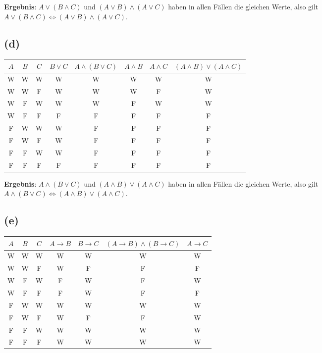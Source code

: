 \documentclass[a4paper]{scrartcl}
\begin{document}
\textbf{Ergebnis}: $A \lor (B \land C)$ und $(A \lor B) \land (A \lor C)$ haben in allen Fällen die gleichen Werte, also gilt $A \lor (B \land C) \Leftrightarrow (A \lor B) \land (A \lor C)$.

\subsection*{(d)}

\begin{tabular}{|c|c|c|c|c|c|c|c|}
\hline
$A$ & $B$ & $C$ & $B \lor C$ & $A \land (B \lor C)$ & $A \land B$ & $A \land C$ & $(A \land B) \lor (A \land C)$ \\
\hline
W & W & W & W & W & W & W & W \\
W & W & F & W & W & W & F & W \\
W & F & W & W & W & F & W & W \\
W & F & F & F & F & F & F & F \\
F & W & W & W & F & F & F & F \\
F & W & F & W & F & F & F & F \\
F & F & W & W & F & F & F & F \\
F & F & F & F & F & F & F & F \\
\hline
\end{tabular}

\textbf{Ergebnis}: $A \land (B \lor C)$ und $(A \land B) \lor (A \land C)$ haben in allen Fällen die gleichen Werte, also gilt $A \land (B \lor C) \Leftrightarrow (A \land B) \lor (A \land C)$.

\subsection*{(e)}

\begin{tabular}{|c|c|c|c|c|c|c|}
\hline
$A$ & $B$ & $C$ & $A \rightarrow B$ & $B \rightarrow C$ & $(A \rightarrow B) \land (B \rightarrow C)$ & $A \rightarrow C$ \\
\hline
W & W & W & W & W & W & W \\
W & W & F & W & F & F & F \\
W & F & W & F & W & F & W \\
W & F & F & F & W & F & F \\
F & W & W & W & W & W & W \\
F & W & F & W & F & F & W \\
F & F & W & W & W & W & W \\
F & F & F & W & W & W & W \\
\hline
\end{tabular}
\end{document}

